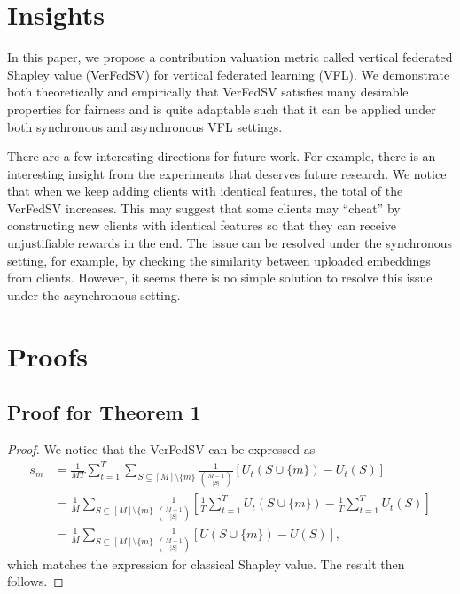 \section{Insights} \label{sec:8.9}
In this paper, we propose a contribution valuation metric called vertical federated Shapley value (VerFedSV) for vertical federated learning (VFL). We demonstrate both theoretically and empirically that VerFedSV satisfies many desirable properties for fairness and is quite adaptable such that it can be applied under both synchronous and asynchronous VFL settings. 

There are a few interesting directions for future work.  For example, there is an interesting insight from the experiments that deserves future research.  We notice that when we keep adding clients with identical features, the total of the VerFedSV increases. This may suggest that some clients may ``cheat'' by constructing new clients with identical features so that they can receive unjustifiable rewards in the end. The issue can be resolved under the synchronous setting, for example, by checking the similarity between uploaded embeddings from clients. However, it seems there is no simple solution to resolve this issue under the asynchronous setting. 

\section{Proofs}

\subsection{Proof for Theorem 1}
\begin{proof}
    We notice that the VerFedSV can be expressed as 
    \begin{align*}
        s_m &= \frac{1}{MT}\sum_{t=1}^T\sum_{S \subseteq [M] \setminus \{m\}} \frac{1}{\binom{M-1}{|S|}} [U_t(S\cup\{m\}) - U_t(S)]\\
        &= \frac{1}{M}\sum_{S \subseteq [M] \setminus \{m\}} \frac{1}{\binom{M-1}{|S|}} \left[\frac{1}{T}\sum_{t=1}^T U_t(S\cup\{m\}) - \frac{1}{T}\sum_{t=1}^T U_t(S)\right]\\
        &= \frac{1}{M}\sum_{S \subseteq [M] \setminus \{m\}} \frac{1}{\binom{M-1}{|S|}} \left[U(S\cup\{m\}) - U(S)\right],
    \end{align*}
    which matches the expression for classical Shapley value. The result then follows. 
\end{proof}

